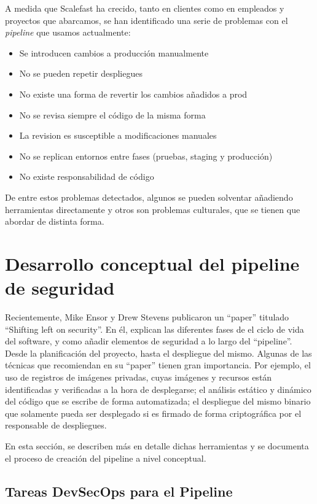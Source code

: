 \documentclass[12pt]{report} %
\begin{document}
A medida que Scalefast ha crecido, tanto en clientes como en empleados y
proyectos que abarcamos, se han identificado una serie de problemas con el
\textit{\gls{pipeline}} que usamos actualmente: 

\begin{itemize} \item{Se introducen cambios a producción manualmente} \item{No
    se pueden repetir despliegues} \item{No existe una forma de revertir los
    cambios añadidos a prod} \item{No se revisa siempre el código de la misma
    forma} \item{La revision es susceptible a modificaciones manuales} \item{No
se replican entornos entre fases (pruebas, \gls{staging} y producción)} \item{No
existe responsabilidad de código} \end{itemize}

De entre estos problemas detectados, algunos se pueden solventar añadiendo
herramientas directamente y otros son problemas culturales, que se tienen que
abordar de distinta forma.


\section{Desarrollo conceptual del pipeline de seguridad}

Recientemente, Mike Ensor y Drew Stevens publicaron un ``paper'' titulado
``Shifting left on security''.  En él, explican las diferentes fases de el ciclo
de vida del software, y como añadir elementos de seguridad a lo largo del
``pipeline''.  Desde la planificación del proyecto, hasta el despliegue del
mismo.  Algunas de las técnicas que recomiendan en su ``paper'' tienen gran
importancia. Por ejemplo,  el uso de registros de imágenes privadas, cuyas
imágenes y recursos están identificadas y verificadas a la hora de desplegarse;
el análisis estático y dinámico del código que se escribe de forma automatizada;
el despliegue del mismo binario que solamente pueda ser desplegado si es firmado
de forma criptográfica por el responsable de despliegues.\cite{Ensor2021}

En esta sección, se describen más en detalle dichas herramientas y se documenta
el proceso de creación del pipeline a nivel conceptual.

\subsection{Tareas DevSecOps para el Pipeline}
\end{document}
